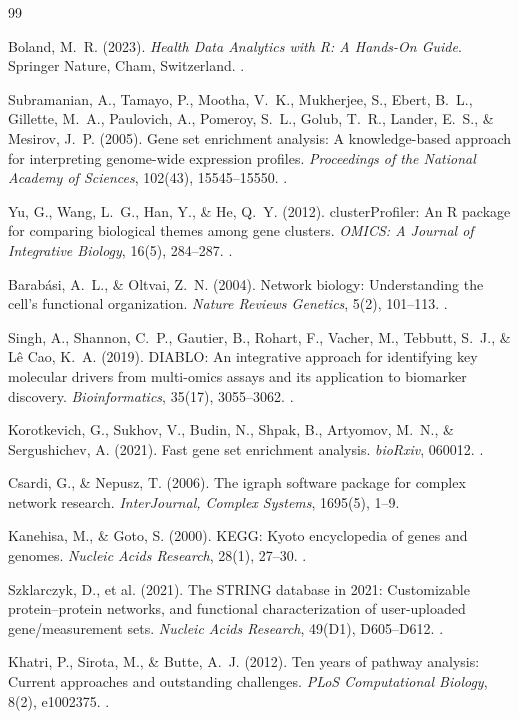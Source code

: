 \documentclass[11pt,twoside,openright]{book}
\begin{document}
\begin{thebibliography}{99}

Boland, M.~R. (2023). \textit{Health Data Analytics with R: A Hands-On Guide}. Springer Nature, Cham, Switzerland. .

Subramanian, A., Tamayo, P., Mootha, V.~K., Mukherjee, S., Ebert, B.~L., Gillette, M.~A., Paulovich, A., Pomeroy, S.~L., Golub, T.~R., Lander, E.~S., \& Mesirov, J.~P. (2005). Gene set enrichment analysis: A knowledge-based approach for interpreting genome-wide expression profiles. \textit{Proceedings of the National Academy of Sciences}, 102(43), 15545--15550. .

Yu, G., Wang, L.~G., Han, Y., \& He, Q.~Y. (2012). clusterProfiler: An R package for comparing biological themes among gene clusters. \textit{OMICS: A Journal of Integrative Biology}, 16(5), 284--287. .

Barab\'asi, A.~L., \& Oltvai, Z.~N. (2004). Network biology: Understanding the cell's functional organization. \textit{Nature Reviews Genetics}, 5(2), 101--113. .

Singh, A., Shannon, C.~P., Gautier, B., Rohart, F., Vacher, M., Tebbutt, S.~J., \& L\^e Cao, K.~A. (2019). DIABLO: An integrative approach for identifying key molecular drivers from multi-omics assays and its application to biomarker discovery. \textit{Bioinformatics}, 35(17), 3055--3062. .

Korotkevich, G., Sukhov, V., Budin, N., Shpak, B., Artyomov, M.~N., \& Sergushichev, A. (2021). Fast gene set enrichment analysis. \textit{bioRxiv}, 060012. .

Csardi, G., \& Nepusz, T. (2006). The igraph software package for complex network research. \textit{InterJournal, Complex Systems}, 1695(5), 1--9.

Kanehisa, M., \& Goto, S. (2000). KEGG: Kyoto encyclopedia of genes and genomes. \textit{Nucleic Acids Research}, 28(1), 27--30. .

Szklarczyk, D., et al. (2021). The STRING database in 2021: Customizable protein--protein networks, and functional characterization of user-uploaded gene/measurement sets. \textit{Nucleic Acids Research}, 49(D1), D605--D612. .

Khatri, P., Sirota, M., \& Butte, A.~J. (2012). Ten years of pathway analysis: Current approaches and outstanding challenges. \textit{PLoS Computational Biology}, 8(2), e1002375. .

\end{thebibliography}
\end{document}
